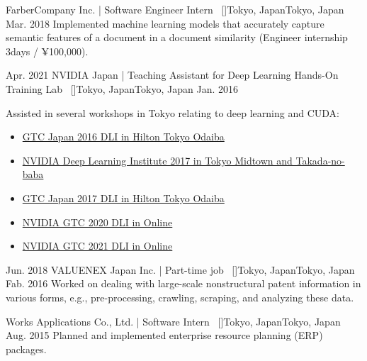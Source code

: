 \begin{experiences}
    \emptySeparator
    \researchexperience
    {}   {FarberCompany Inc. | Software Engineer Intern{\normalfont  ~ [\href{https://www.fabercompany.co.jp/}{\small{\websiteSymbol}}]}}{Tokyo, Japan}{Tokyo, Japan}
    {Mar. 2018} {
    Implemented machine learning models that accurately capture semantic features of a document in a document similarity (Engineer internship 3days / ¥100,000).
    }

    \emptySeparator
    \researchexperience
    {Apr. 2021}   {NVIDIA Japan | Teaching Assistant for Deep Learning Hands-On Training Lab{\normalfont  ~ [\href{https://www.nvidia.com/ja-jp/}{\small{\websiteSymbol}}]}}{Tokyo, Japan}{Tokyo, Japan}
    {Jan. 2016} {
    Assisted in several workshops in Tokyo relating to deep learning and CUDA:
    \begin{itemize}
        \item \href{https://nvidia.connpass.com/event/39743/}{GTC Japan 2016 DLI in Hilton Tokyo Odaiba}
        \item \href{https://nvidia.connpass.com/event/54780/}{NVIDIA Deep Learning Institute 2017 in Tokyo Midtown and Takada-no-baba}
        \item \href{https://nvidia.connpass.com/event/68912/}{GTC Japan 2017 DLI in Hilton Tokyo Odaiba}
        \item \href{https://nvidia.connpass.com/event/189637/}{NVIDIA GTC 2020 DLI in Online}
        \item \href{https://nvidia.connpass.com/event/208506/}{NVIDIA GTC 2021 DLI in Online}
    \end{itemize}
    }

    \emptySeparator
    \researchexperience
    {Jun. 2018}   {VALUENEX Japan Inc. | Part-time job{\normalfont  ~ [\href{https://en.valuenex.com/en/home}{\small{\websiteSymbol}}]}}{Tokyo, Japan}{Tokyo, Japan}
    {Fab. 2016} {
    Worked on dealing with large-scale nonstructural patent information in various forms, e.g., pre-processing, crawling, scraping, and analyzing these data.
    }

    \emptySeparator
    \researchexperience
    {}   {Works Applications Co., Ltd. | Software Intern{\normalfont  ~ [\href{https://www.worksap.com/}{\small{\websiteSymbol}}]}}{Tokyo, Japan}{Tokyo, Japan}
    {Aug. 2015} {
    Planned and implemented enterprise resource planning (ERP) packages.
    }

\end{experiences}
